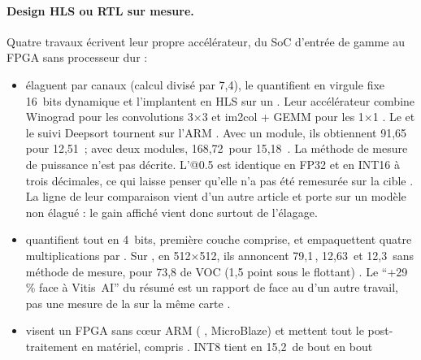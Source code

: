 \paragraph{Design HLS ou RTL sur mesure.} Quatre travaux écrivent leur propre accélérateur,
du SoC d'entrée de gamme au FPGA sans processeur dur :
\begin{itemize}
  \item \citet{2023-zhai-fpga-vehicle-detection-tracking-accelerator} élaguent 
    par canaux (calcul divisé par 7,4), le quantifient en virgule fixe 16~bits dynamique et
    l'implantent en HLS sur un  . Leur accélérateur combine Winograd pour les
    convolutions 3$\times$3 et im2col + GEMM pour les 1$\times$1 . Le 
    et le suivi Deepsort tournent sur l'ARM . Avec un module, ils obtiennent
    91,65\, pour 12,51\, ; avec deux modules, 168,72\, pour 15,18\,
    . La méthode de mesure de puissance n'est pas décrite. L'@0.5 est
    identique en FP32 et en INT16 à trois décimales, ce qui laisse penser qu'elle n'a pas
    été remesurée sur la cible \deduit. La ligne  de leur comparaison vient d'un
    autre article et porte sur un modèle non élagué  : le gain affiché vient
    donc surtout de l'élagage.
  \item \citet{2024-yan-fpga-yolov5-accelerator-real-time} quantifient tout  en
    4~bits, première couche comprise, et empaquettent quatre multiplications par 
    . Sur , en 512$\times$512, ils annoncent 79,1\,, 12,63\, et
    12,3\, sans méthode de mesure, pour 73,8 de  VOC (1,5 point sous le flottant)
    . Le \enquote{+29\,\% face à Vitis~AI} du résumé est un rapport de
     face au  d'un autre travail, pas une mesure de la  sur la même carte
    .
  \item \citet{2024-zhang-end-end-acceleration-yolo-object} visent un FPGA sans cœur ARM
    ( , MicroBlaze) et mettent tout le post-traitement en matériel, 
    compris .  INT8 tient en 15,2\, de bout en bout

\end{itemize}
